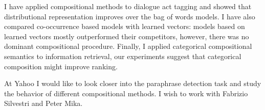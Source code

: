 \documentclass[10pt]{article}
\begin{document}
I have applied compositional methods to dialogue act tagging and showed
that distributional representation improves over the bag of words models. I have
also compared co-occurrence based models with learned vectors: models based on
learned vectors mostly outperformed their competitors, however, there was no
dominant compositional procedure. Finally, I applied categorical compositional
semantics to information retrieval, our experiments suggest that categorical
composition might improve ranking.

At Yahoo I would like to look closer into the paraphrase detection task and
study the behavior of different compositional methods. I wish to work with
Fabrizio Silvestri and Peter Mika.
\end{document}
